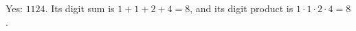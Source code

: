 Yes: $\boxed{1124}$. Its digit sum is $1+1+2+4=8$, and its digit product is $1\cdot1\cdot2\cdot4=8$.
